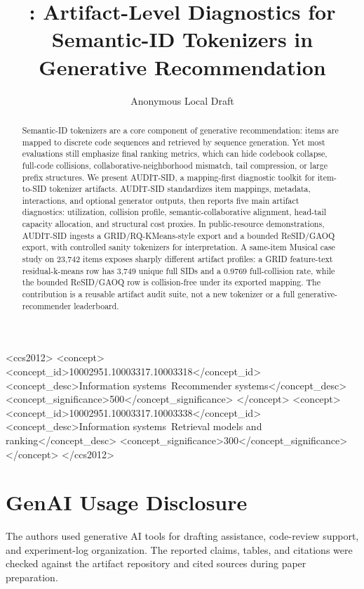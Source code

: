 \documentclass[sigconf,review,anonymous]{acmart}
\title{\tool: Artifact-Level Diagnostics for Semantic-ID Tokenizers in Generative Recommendation}
\author{Anonymous Local Draft}
\affiliation{%
  \institution{Anonymous Institution}
  \country{}
}
\newcommand{\tool}{AUDIT-SID\xspace}
\newcommand{\sid}{SID\xspace}
\begin{document}
\begin{CCSXML}
<ccs2012>
 <concept>
  <concept_id>10002951.10003317.10003318</concept_id>
  <concept_desc>Information systems~Recommender systems</concept_desc>
  <concept_significance>500</concept_significance>
 </concept>
 <concept>
  <concept_id>10002951.10003317.10003338</concept_id>
  <concept_desc>Information systems~Retrieval models and ranking</concept_desc>
  <concept_significance>300</concept_significance>
 </concept>
</ccs2012>
\end{CCSXML}


\begin{abstract}
Semantic-ID tokenizers are a core component of generative recommendation:
items are mapped to discrete code sequences and retrieved by sequence
generation. Yet most evaluations still emphasize final ranking metrics, which
can hide codebook collapse, full-code collisions, collaborative-neighborhood
mismatch, tail compression, or large prefix structures. We present
\tool, a mapping-first diagnostic toolkit for item-to-\sid tokenizer
artifacts. \tool standardizes item mappings, metadata, interactions, and
optional generator outputs, then reports five main artifact diagnostics:
utilization, collision profile, semantic-collaborative alignment, head-tail
capacity allocation, and structural cost proxies. In public-resource
demonstrations, \tool ingests a GRID/RQ-KMeans-style export and a bounded
ReSID/GAOQ export, with controlled sanity tokenizers for interpretation. A
same-item Musical case study on 23,742 items exposes sharply different artifact profiles: a
GRID feature-text residual-k-means row has 3,749 unique full \sid{}s and a
0.9769 full-collision rate, while the bounded ReSID/GAOQ row is
collision-free under its exported mapping. The contribution is a reusable
artifact audit suite, not a new tokenizer or a full generative-recommender
leaderboard.
\end{abstract}

\maketitle






\clearpage



\section*{GenAI Usage Disclosure}
The authors used generative AI tools for drafting assistance, code-review
support, and experiment-log organization. The reported claims, tables, and
citations were checked against the artifact repository and cited sources during
paper preparation.
\end{document}
